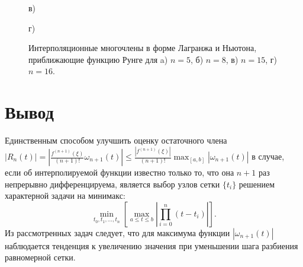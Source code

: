 \documentclass[
11pt,
master, %
subf, %
href, %
colorlinks=true, %
times, %
]{disser}
\begin{document}
\begin{figure}[h]
\begin{minipage}[h]{0.47\linewidth}
 в) \\
\end{minipage}
\hfill
\begin{minipage}[h]{0.47\linewidth}
 г) \\
\end{minipage}
\caption{Интерполяционные многочлены в форме Лагранжа и Ньютона, приближающие функцию Рунге для a) $n=5$, б) $n=8$, в) $n=15$, г) $n=16$.}
\label{ris:2}
\end{figure}

\section{Вывод}

Единственным способом улучшить оценку остаточного члена \\$\displaystyle|R_n(t)| = \left|\frac{f^{(n+1)}(\xi)}{(n+1)!}\omega_{n+1}(t)\right| \leq \frac{|f^{(n+1)}(\xi)|}{(n+1)!}\max_{[a,b]}{|\omega_{n+1}(t)|}$ в случае, если об интерполируемой функции известно только то, что она $n+1$ раз непрерывно дифференцируема, является выбор узлов сетки $\{t_i\}$ решением характерной задачи на минимакс:
$$\min_{t_0,t_1,...,t_n}\left[\max_{a\leq t\leq b}\left|\prod_{i=0}^n(t-t_i)\right|\right].$$
Из рассмотренных задач следует, что для максимума функции $|\omega_{n+1}(t)|$ наблюдается тенденция к увеличению значения при уменьшении шага разбиения равномерной сетки.
\end{document}
